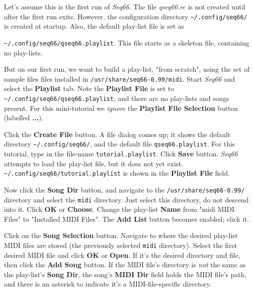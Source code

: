    Let's assume this is the first run of \textsl{Seq66}.
   The file \textsl{qseq66.rc} is not created until after the first
   run exits.
   However, the configuration directory
   \texttt{\textasciitilde/.config/seq66/} is created at startup.
   Also, the default play-list file is set as

   \texttt{\textasciitilde/.config/seq66/qseq66.playlist}.
   This file starts as a skeleton file, containing no play-lists.

   But on our first run, we want to build a play-list, "from scratch",
   using the set of sample files files installed in
   \texttt{/usr/share/seq66-0.99/midi}.
   Start \textsl{Seq66} and select the \textbf{Playlist} tab.
   Note the \textbf{Playlist File} is set to
   \texttt{\textasciitilde/.config/seq66/qseq66.playlist}, and
   there are no play-lists and songs present.
   For this mini-tutorial we \textsl{ignore}
   the \textbf{Playlist File Selection}
   button (labelled \textbf{...}).

   Click the \textbf{Create File} button.
   A file dialog comes up; it shows the default directory
   \texttt{\textasciitilde/.config/seq66/}, and the default file
   \texttt{qseq66.playlist}.
   For this tutorial, type in the file-name
   \texttt{tutorial.playlist}.
   Click \textbf{Save} button.
   \textsl{Seq66} attempts to load the play-list file, but it
   does not yet exist.
   \texttt{\textasciitilde/.config/seq66/tutorial.playlist} is
   shown in the \textbf{Playlist File} field.

   Now click the \textbf{Song Dir} button,
   and navigate to the
   \texttt{/usr/share/seq66-0.99/} directory and select the
   \texttt{midi} directory.
   Just select this directory, do not descend into it.
   Click \textbf{OK} or \textbf{Choose}.
   Change the play-list \textbf{Name} from
   "midi MIDI Files" to "Installed MIDI Files".
   The \textbf{Add List} button becomes enabled; click it.
   
   Click on the \textbf{Song Selection} button.
   Navigate to where the desired play-list MIDI files are stored
   (the previously selected \texttt{midi} directory).
   Select the first desired MIDI file and click \textbf{OK} or
   \textbf{Open}.
   If it's the desired directory and file,
   then click the \textbf{Add Song} button.
   If the MIDI file's directory is \textsl{not} the same as the play-list's
   \textbf{Song Dir},
   the song's \textbf{MIDI Dir} field holds the MIDI file's
   path, and there is an asterisk to indicate it's a
   MIDI-file-specific directory.


